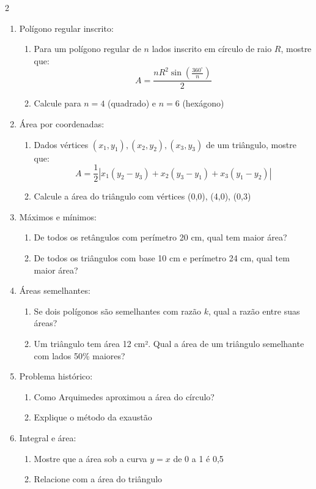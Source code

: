 \documentclass[11pt]{article}
\begin{document}
\begin{multicols}{2}
\begin{enumerate}[leftmargin=*]
\begin{enumerate}[leftmargin=*, start=11]
\item Polígono regular inscrito:
\begin{enumerate}[label=\alph*)]
\item Para um polígono regular de $n$ lados inscrito em círculo de raio $R$, mostre que:
  \[
  A = \frac{nR^2 \sin\left(\frac{360^\circ}{n}\right)}{2}
  \]
\item Calcule para $n=4$ (quadrado) e $n=6$ (hexágono)
\end{enumerate}

\item Área por coordenadas:
\begin{enumerate}[label=\alph*)]
\item Dados vértices $(x_1,y_1), (x_2,y_2), (x_3,y_3)$ de um triângulo, mostre que:
  \[
  A = \frac{1}{2}|x_1(y_2-y_3) + x_2(y_3-y_1) + x_3(y_1-y_2)|
  \]
\item Calcule a área do triângulo com vértices (0,0), (4,0), (0,3)
\end{enumerate}

\item Máximos e mínimos:
\begin{enumerate}[label=\alph*)]
\item De todos os retângulos com perímetro 20 cm, qual tem maior área?
\item De todos os triângulos com base 10 cm e perímetro 24 cm, qual tem maior área?
\end{enumerate}

\item Áreas semelhantes:
\begin{enumerate}[label=\alph*)]
\item Se dois polígonos são semelhantes com razão $k$, qual a razão entre suas áreas?
\item Um triângulo tem área 12 cm². Qual a área de um triângulo semelhante com lados 50\% maiores?
\end{enumerate}

\item Problema histórico:
\begin{enumerate}[label=\alph*)]
\item Como Arquimedes aproximou a área do círculo?
\item Explique o método da exaustão
\end{enumerate}

\item Integral e área:
\begin{enumerate}[label=\alph*)]
\item Mostre que a área sob a curva $y = x$ de 0 a 1 é 0,5
\item Relacione com a área do triângulo
\end{enumerate}


\end{enumerate}
\end{enumerate}
\end{multicols}
\end{document}
